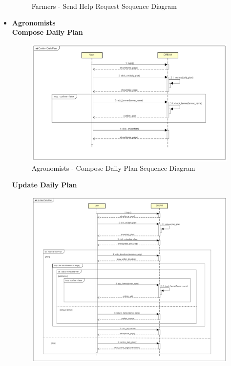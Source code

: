 \documentclass[table, 12pt]{article}
\begin{document}
\begin{itemize}
\begin{center}
\begin{figure}[H]
                    \caption{Farmers - Send Help Request Sequence Diagram}
                    \label{fig: sequence_helprequest}
                \end{figure}
            \end{center}

            \newpage
            \item \textbf{Agronomists}\\
            
            \textbf{Compose Daily Plan}\\
            \begin{center}
                \begin{figure}[H]
                    \includegraphics[scale=0.55, center]{assets/Sequence diagrams/Agronomist/Confirm Daily Plan.png}
                    \caption{Agronomists - Compose Daily Plan Sequence Diagram}
                    \label{fig: sdAgronomist_confirmDailyPlan}
                \end{figure}
            \end{center}
            \newpage
            \textbf{Update Daily Plan}\\
            \begin{center}
                \begin{figure}[H]
                    \includegraphics[scale=0.42, center]{assets/Sequence diagrams/Agronomist/Update Daily Plan.png}

\end{figure}
\end{center}
\end{itemize}
\end{document}
